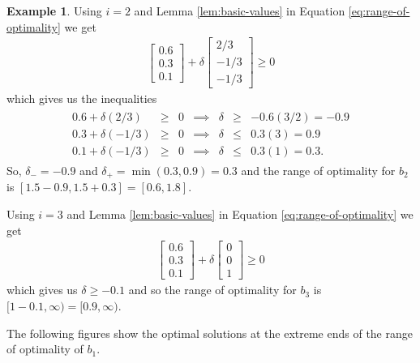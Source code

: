 \documentclass[
]{book}
\theoremstyle{definition}
\theoremstyle{definition}
\newtheorem{example}{Example}[chapter]
\theoremstyle{definition}
\theoremstyle{definition}
\theoremstyle{remark}
\begin{document}
\begin{example}
Using \(i = 2\) and Lemma \ref{lem:basic-values} in Equation \eqref{eq:range-of-optimality} we get
\begin{align*}
  \begin{bmatrix} 0.6 \\ 0.3 \\ 0.1 \end{bmatrix} 
  + \delta
  \begin{bmatrix}
    2/3 \\ 
    -1/3 \\
    -1/3
  \end{bmatrix} \ge 0
\end{align*}
which gives us the inequalities
\begin{align*}
  \begin{array}{lrlrrll}
    0.6 + \delta (2/3) &\ge& 0 & \implies & \delta &\ge& - 0.6 (3/2) = -0.9 \\
    0.3 + \delta (-1/3) &\ge &0 & \implies & \delta &\le &0.3 (3) = 0.9  \\
    0.1 + \delta (-1/3) &\ge &0 & \implies & \delta & \le& 0.3 (1) = 0.3.  
  \end{array}
\end{align*}
So, \(\delta_- = -0.9\) and \(\delta_+ = \min(0.3, 0.9) = 0.3\) and the range of optimality for \(b_2\) is \([1.5 - 0.9, 1.5 + 0.3] = [0.6, 1.8]\).

Using \(i = 3\) and Lemma \ref{lem:basic-values} in Equation \eqref{eq:range-of-optimality} we get
\begin{align*}
  \begin{bmatrix} 0.6 \\ 0.3 \\ 0.1 \end{bmatrix} 
  + \delta
  \begin{bmatrix}
    0 \\ 
    0 \\
    1
  \end{bmatrix} \ge 0
\end{align*}
which gives us \(\delta \ge -0.1\) and so the range of optimality for \(b_3\) is \([1 - 0.1, \infty) = [0.9, \infty)\).

The following figures show the optimal solutions at the extreme ends of the range of optimality of \(b_1\).


\end{example}
\end{document}
